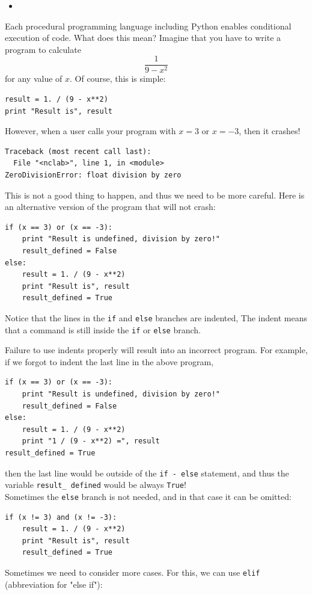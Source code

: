 \begin{itemize}
\item
\end{itemize}

Each procedural programming language including Python enables conditional 
execution of code. What does this mean? Imagine that you have to write
a program to calculate
$$
\frac{1}{9 - x^2}
$$
for any value of $x$. Of course, this is simple:

\begin{verbatim}
result = 1. / (9 - x**2)
print "Result is", result
\end{verbatim}
However, when a user calls your program with $x = 3$ or $x = -3$, then
it crashes!

\begin{verbatim}
Traceback (most recent call last):
  File "<nclab>", line 1, in <module>
ZeroDivisionError: float division by zero
\end{verbatim}
This is not a good thing to happen, and thus we need to be more careful.
Here is an alternative version of the program that will not crash:

\begin{verbatim}
if (x == 3) or (x == -3):
    print "Result is undefined, division by zero!"
    result_defined = False
else:
    result = 1. / (9 - x**2)
    print "Result is", result
    result_defined = True
\end{verbatim}
Notice that the lines in the {\tt if} and {\tt else} branches are indented,
The indent means that a command is still inside the {\tt if} or {\tt else}
branch.

Failure to use indents properly will result into an incorrect program. For 
example, if we forgot to indent the last line in the above program,

\begin{verbatim}
if (x == 3) or (x == -3):
    print "Result is undefined, division by zero!"
    result_defined = False
else:
    result = 1. / (9 - x**2)
    print "1 / (9 - x**2) =", result
result_defined = True
\end{verbatim}
then the last line would be outside of the {\tt if - else} statement, and
thus the variable {\tt result\_ defined} would be always {\tt True}!\\

\noindent
Sometimes the {\tt else} branch is not needed, and in that case it can be omitted:

\begin{verbatim}
if (x != 3) and (x != -3):
    result = 1. / (9 - x**2)
    print "Result is", result
    result_defined = True
\end{verbatim}
Sometimes we need to consider more cases. For this, we can use {\tt elif}
(abbreviation for "else if"):

